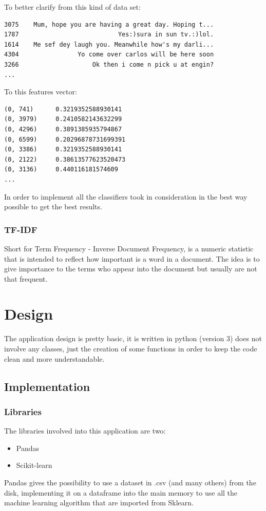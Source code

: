 \documentclass[a4paper]{report}
\begin{document}
\noindent To better clarify from this kind of data set:
\begin{lstlisting}
3075    Mum, hope you are having a great day. Hoping t...
1787                           Yes:)sura in sun tv.:)lol.
1614    Me sef dey laugh you. Meanwhile how's my darli...
4304                Yo come over carlos will be here soon
3266                    Ok then i come n pick u at engin?
...
\end{lstlisting}

\noindent To this features vector:
\begin{lstlisting}
(0, 741)      0.3219352588930141
(0, 3979)     0.2410582143632299
(0, 4296)     0.3891385935794867
(0, 6599)     0.20296878731699391
(0, 3386)     0.3219352588930141
(0, 2122)     0.38613577623520473
(0, 3136)     0.440116181574609
...
\end{lstlisting}

\noindent In order to implement all the classifiers took in consideration in the best way possible to get the best results.

\subsection{TF-IDF} 
Short for Term Frequency - Inverse Document Frequency, is a numeric statistic that is intended to reflect how important is a word in a document. The idea is to give importance to the terms who appear into the document but usually are not that frequent.

\chapter{Design}
The application design is pretty basic, it is written in python (version 3) does not involve any classes, just the creation of some functions in order to keep the code clean and more understandable.
\section{Implementation}
\subsection{Libraries}
The libraries involved into this application are two:
\begin{itemize}
	\item Pandas
	\item Scikit-learn
\end{itemize}
Pandas gives the possibility to use a dataset in .csv (and many others) from the disk, implementing it on a dataframe into the main memory to use all the machine learning algorithm that are imported from Sklearn.
\end{document}
